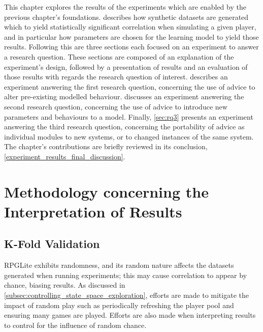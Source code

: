 This chapter explores the results of the experiments which are enabled by the
previous chapter's foundations.  describes how
synthetic datasets are generated which to yield statistically significant
correlation when simulating a given player, and in particular how parameters are
chosen for the learning model to yield those results. Following this are three
sections each focused on an experiment to answer a research question. These
sections are composed of an explanation of the experiment's design, followed by
a presentation of results and an evaluation of those results with regards the
research question of interest.  describes an experiment answering
the first research question, concerning the use of advice to alter pre-existing
modelled behaviour.  discusses an experiment answering the second 
research question, concerning the use of advice to introduce new parameters and
behaviours to a model. Finally, \cref{sec:rq3} presents an experiment answering the
third research question, concerning the portability of advice as individual
modules to new systems, or to changed instances of the same system. The
chapter's contributions are briefly reviewed in its conclusion,
\cref{experiment_results_final_discussion}.


\section{Methodology concerning the Interpretation of Results}
\label{methodology_explained}

\subsection{K-Fold Validation}
\label{k_fold_validation_explanation}


RPGLite exhibits randomness, and its random nature affects the datasets
generated when running experiments; this may cause correlation to appear by
chance, biasing results. As discussed in
\cref{subsec:controlling_state_space_exploration}, efforts are made to mitigate
the impact of random play such as periodically refreshing the player pool and
ensuring many games are played. Efforts are also made when interpreting results
to control for the influence of random chance.

